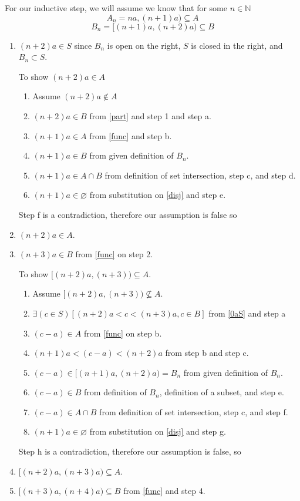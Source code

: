 \documentclass[12pt]{article}
\begin{document}
\newpage
\begin{framed}
    For our inductive step, we will assume we know that for some $n \in \mathbb{N}$
    \[A_n = na, (n+1)a) \subseteq A\]
    \[B_n = [(n+1)a, (n+2)a) \subseteq B\]
    \begin{enumerate}
        \item $(n+2)a \in S$ since $B_n$ is open on the right, $S$ is closed in the right, and $B_n \subset S$.
        \begin{framed}
            To show $(n+2)a \in A$
            \begin{enumerate}
                \item Assume $(n+2)a \notin A$
                \item $(n+2)a \in B$ from \eqref{part} and step 1 and step a.
                \item $(n+1)a \in A$ from \eqref{func} and step b.
                \item $(n+1)a \in B$ from given definition of $B_n$.
                \item $(n+1)a \in A \cap B$ from definition of set intersection, step c, and step d.
                \item $(n+1)a \in \varnothing$ from substitution on \eqref{disj} and step e.
            \end{enumerate}
            Step f is a contradiction, therefore our assumption is false so
        \end{framed}
        \item $(n+2)a \in A$.
        \item $(n+3)a \in B$ from \eqref{func} on step 2.
        \begin{framed}
            To show $[(n+2)a, (n+3)) \subseteq A$.
            \begin{enumerate}
                \item Assume $[(n+2)a, (n+3)) \not \subseteq A$.
                \item $\exists (c \in S)[(n+2)a < c < (n+3)a, c \in B]$ from \eqref{0aS} and step a
                \item $(c-a) \in A$ from \eqref{func} on step b.
                \item $(n+1)a < (c-a) < (n+2)a$ from step b and step c.
                \item $(c-a) \in [(n+1)a, (n+2)a) = B_n$ from given definition of $B_n$.
                \item $(c-a) \in B$ from definition of $B_n$, definition of a subset, and step e.
                \item $(c-a) \in A \cap B$ from definition of set intersection, step c, and step f.
                \item $(n+1)a \in \varnothing$ from substitution on \eqref{disj} and step g.
            \end{enumerate}
            Step h is a contradiction, therefore our assumption is false, so 
        \end{framed}
        \item $[(n+2)a, (n+3)a) \subseteq A$.
        \item $[(n+3)a, (n+4)a) \subseteq B$ from \eqref{func} and step 4.
    \end{enumerate}
    

\end{framed}
\end{document}
